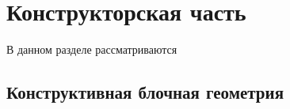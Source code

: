 \section{Конструкторская часть}

В  данном  разделе  рассматриваются

\subsection{Конструктивная блочная геометрия}
